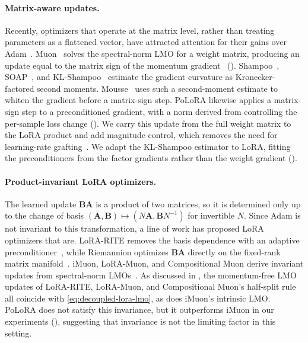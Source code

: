 \documentclass{article}
\newcommand{\mat}[1]{\bm{#1}}
\newcommand{\methodname}{PoLoRA\xspace}
\begin{document}
\paragraph{Matrix-aware updates.}
Recently, optimizers that operate at the matrix level, rather than treating parameters as
a flattened vector, have attracted attention for their gains over Adam~\cite{liu2025muon,
qiu2026hyperparameter, benchmark_practices}. Muon~\cite{muon} solves the spectral-norm LMO
for a weight matrix, producing an update equal to the matrix sign of the momentum
gradient~\cite{polarexpress} (). Shampoo~\cite{shampoo},
SOAP~\cite{soap}, and KL-Shampoo~\cite{klshampoo} estimate the gradient curvature as
Kronecker-factored second moments. Mousse~\cite{mousse} uses such a second-moment estimate to
whiten the gradient before a matrix-sign step. \methodname{} likewise applies a matrix-sign step to a preconditioned gradient, with a norm derived from controlling the per-sample loss change (). We carry this update from the full weight matrix to the LoRA product and add magnitude control, which removes the need for learning-rate grafting~\cite{shi2023distributed, mousse}. We adapt the KL-Shampoo estimator to LoRA, fitting the preconditioners from the factor gradients rather than the weight gradient ().

\paragraph{Product-invariant LoRA optimizers.}
The learned update $\mat{B}\mat{A}$ is a product of two matrices, so it is determined only up to the
change of basis $(\mat{A},\mat{B})\mapsto(N\mat{A},\mat{B}N^{-1})$ for invertible $N$. Since Adam is not invariant
to this transformation, a line of work has proposed LoRA optimizers that are. LoRA-RITE
removes the basis dependence with an adaptive preconditioner~\cite{lorarite}, while Riemannion
optimizes $\mat{B}\mat{A}$ directly on the fixed-rank matrix manifold~\cite{riemannion}. iMuon, LoRA-Muon, and Compositional Muon derive invariant updates from
spectral-norm LMOs~\cite{imuon,loramuon,tilde_csd}. As discussed in , the momentum-free LMO updates of LoRA-RITE, LoRA-Muon,
and Compositional Muon's half-split rule all coincide with \eqref{eq:decoupled-lora-lmo}, as does iMuon's intrinsic LMO. \methodname{} does not satisfy this invariance, but it outperforms iMuon in our experiments (), suggesting that invariance is not the limiting factor in this setting.
\end{document}
